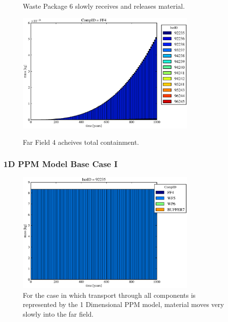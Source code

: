 \begin{frame}
\begin{figure}[ht]
\begin{minipage}[b]{0.45\linewidth}
  \caption[Case ODI Waste Package Contaminants.]{ 
    Waste Package 6 slowly receives and releases material. 
    }
  \label{fig:drIVwp6}
  \includegraphics[width=0.8\textwidth]{./images/od0.eps}
  \caption[Case ODI Waste Package Contaminants.]{ 
    Far Field 4 acheives total containment.
    }
  \label{fig:drIVff0}


  \end{minipage}
\end{figure}
\end{frame}

\begin{frame}
\frametitle{1D PPM Model Base Case I}
\begin{figure}[ht]
\centering
\includegraphics[width=0.8\textwidth]{./images/od.eps}
\caption[1 Dimensional PPM Model.]{
For the case in which transport through all components is represented by the 1 
Dimensional PPM model, material moves very slowly into the far field. 
}
\label{fig:odall}
\end{figure}
\end{frame}


